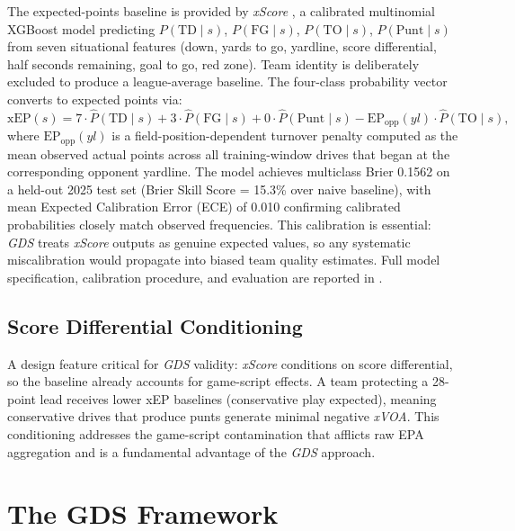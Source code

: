 \documentclass[12pt,a4paper]{article}
\newcommand{\xscore}{\textit{xScore}}
\newcommand{\xvoa}{\textit{xVOA}}
\newcommand{\gds}{\textit{GDS}}
\begin{document}
The expected-points baseline is provided by \xscore{} \citep{mecha2026xscore-model}, a calibrated multinomial XGBoost model predicting $P(\text{TD} \mid s)$, $P(\text{FG} \mid s)$, $P(\text{TO} \mid s)$, $P(\text{Punt} \mid s)$ from seven situational features (down, yards to go, yardline, score differential, half seconds remaining, goal to go, red zone). Team identity is deliberately excluded to produce a league-average baseline. The four-class probability vector converts to expected points via:
\begin{equation}
  \label{eq:xep}
  \text{xEP}(s) = 7 \cdot \hat{P}(\text{TD} \mid s)
                 + 3 \cdot \hat{P}(\text{FG} \mid s)
                 + 0 \cdot \hat{P}(\text{Punt} \mid s)
                 - \text{EP}_{\text{opp}}(yl) \cdot \hat{P}(\text{TO} \mid s),
\end{equation}
where $\text{EP}_{\text{opp}}(yl)$ is a field-position-dependent turnover penalty computed as the mean observed actual points across all training-window drives that began at the corresponding opponent yardline. The model achieves multiclass Brier 0.1562 on a held-out 2025 test set (Brier Skill Score = 15.3\% over naive baseline), with mean Expected Calibration Error (ECE) of 0.010 confirming calibrated probabilities closely match observed frequencies. This calibration is essential: \gds{} treats \xscore{} outputs as genuine expected values, so any systematic miscalibration would propagate into biased team quality estimates. Full model specification, calibration procedure, and evaluation are reported in \citet{mecha2026xscore-model}.

\subsection{Score Differential Conditioning}

A design feature critical for \gds{} validity: \xscore{} conditions on score differential, so the baseline already accounts for game-script effects. A team protecting a 28-point lead receives lower xEP baselines (conservative play expected), meaning conservative drives that produce punts generate minimal negative \xvoa{}. This conditioning addresses the game-script contamination that afflicts raw EPA aggregation and is a fundamental advantage of the \gds{} approach.

\section{The GDS Framework}
\label{sec:framework}
\end{document}
